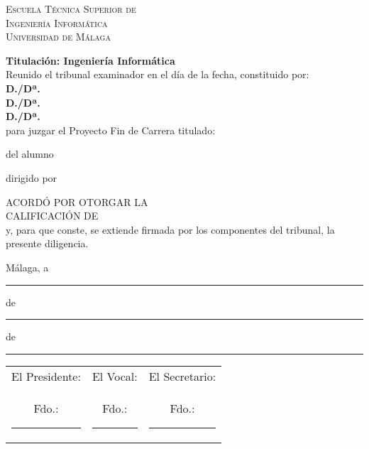 \thispagestyle{empty}
\begin{center}
  \Large \sffamily \scshape %
  Escuela Técnica Superior de\\
  Ingeniería Informática\\
  Universidad de Málaga
\end{center}

  {\bfseries Titulación: Ingeniería Informática}\\[3ex]

  \noindent Reunido el tribunal examinador en el día de la fecha, constituido por:\\[3ex]
  \textbf{D./Dª.~}\hrulefill\\[3ex]
  \textbf{D./Dª.~}\hrulefill\\[3ex]
  \textbf{D./Dª.~}\hrulefill\\[3ex]
  
  para juzgar el Proyecto Fin de Carrera titulado:\noindent 
  
\begin{center}
  \large \bfseries \pfctitlename
\end{center}

\noindent del alumno 

\noindent dirigido por 

\bigskip

  \noindent ACORDÓ POR \hrulefill OTORGAR LA\\[3ex]%
  CALIFICACIÓN DE\hrulefill\\[3ex]
  
  
  \noindent y, para que conste, se extiende firmada por los componentes del tribunal, la presente diligencia.
  
  \bigskip

\hfill Málaga, a \rule{1cm}{0.1mm} de \rule{1cm}{0.1mm} de \rule{0.7cm}{0.1mm}

\vfill

\begin{center}
  \begin{tabular}{ccc}
  El Presidente: & El Vocal: & El Secretario:\\[2cm]
  Fdo.:\rule{3cm}{0.1mm} & Fdo.:\rule{3cm}{0.1mm} & Fdo.:\rule{3cm}{0.1mm}  
  \end{tabular}
\end{center}

\blankpage

